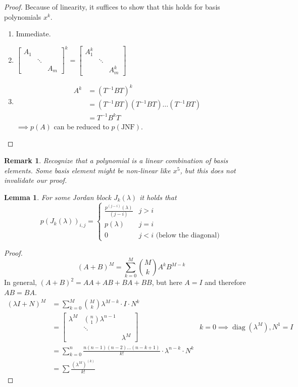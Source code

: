 \documentclass{article}
\newcounter{lecref}[section]
\numberwithin{lecref}{section}
\newtheorem{lemma}[lecref]{Lemma}
\newtheorem{remark}[lecref]{Remark}
\DeclareMathOperator{\diag}{diag}
\begin{document}
\begin{proof}
  Because of linearity, it suffices to show that this holds for basis polynomials $x^k$.
  \begin{enumerate}
    \item Immediate.
    \item $\begin{bmatrix} A_1 & & \\ & \ddots & \\ & & A_m \end{bmatrix}^k = \begin{bmatrix} A_1^k & & \\ & \ddots & \\ & & A_m^k \end{bmatrix}$
    \item
      \begin{align*}
        A^k &= (T^{-1} BT)^k \\
            &= (T^{-1} BT)(T^{-1} BT) \dots (T^{-1} BT) \\
            &= T^{-1} B^k T
      \end{align*}
      $\implies p(A)$ can be reduced to $p(\text{JNF})$.
  \end{enumerate}
\end{proof}

\begin{remark}
  Recognize that a polynomial is a linear combination of basis elements.
  Some basis element might be non-linear like $x^5$, but this does not invalidate our proof.
\end{remark}

\begin{lemma} %
  For some Jordan block $J_k(\lambda)$ it holds that
  \[
    p(J_k(\lambda))_{i,j} = \begin{cases}
      \frac{p^{(j - i)}(\lambda)}{(j - i)} & j > i \\
      p(\lambda) & j = i \\
      0 & j < i \text{ (below the diagonal)}
    \end{cases}
  \]
\end{lemma}

\begin{proof}
  \[ (A + B)^M = \sum_{k=0}^M {M \choose k} A^k B^{M - k} \]
  In general, $(A + B)^2 = AA + AB + BA + BB$, but here $A = I$ and therefore $AB = BA$.
  \begin{align*}
    (\lambda I + N)^M
      &= \sum_{k=0}^M {M \choose k} \lambda^{M-k} \cdot I \cdot N^k \\
      &= \begin{bmatrix} \lambda^M & {n \choose 1} \lambda^{n-1} & \\ & \ddots & \\ & & \lambda^M \end{bmatrix} & k=0 \implies \diag(\lambda^M), N^1 = I \\
      &= \sum_{k=0}^n \frac{n (n-1)(n-2) \dots (n-k+1)}{k!} \cdot \lambda^{n-k} \cdot N^k \\
      &= \sum \frac{(\lambda^M)^{(k)}}{k!}
  \end{align*}
\end{proof}
\end{document}

